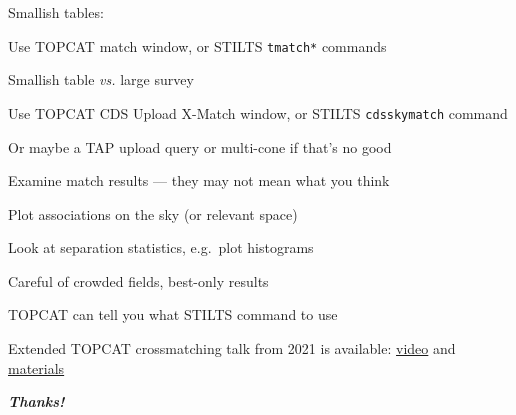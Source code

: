 \documentclass[20pt,landscape]{foils}
\newcommand{\bhref}[2]{\href{#1}{{\color{blue}#2}}}
\begin{document}
\begin{list0}
  \item Smallish tables:
  \begin{list2big}
    \item Use TOPCAT match window,
          or STILTS {\color{brown}\tt tmatch*} commands
  \end{list2big}
  \item Smallish table {\sl vs.\/} large survey
  \begin{list2big}
    \item Use TOPCAT CDS Upload X-Match window,
          or STILTS {\color{brown}\tt cdsskymatch} command
    \item Or maybe a TAP upload query or multi-cone if that's no good
  \end{list2big}
  \item Examine match results --- they may not mean what you think
  \begin{list2big}
    \item Plot associations on the sky (or relevant space)
    \item Look at separation statistics, e.g.\ plot histograms
    \item Careful of crowded fields, best-only results
  \end{list2big}
  \item TOPCAT can tell you what STILTS command to use
  \item Extended TOPCAT crossmatching talk from 2021 is available:
        \bhref{https://youtu.be/mdMtmy3Zq-Q&t=3582s}{video} and
        \bhref{https://www.star.bristol.ac.uk/mbt/talks/shristi2021/}{materials}
\end{list0}

\vspace{0.2cm}
\begin{center}
  {\color{darkred}\Huge\bf\sl Thanks!}
\end{center}

\label{lastPage}
\end{document}
